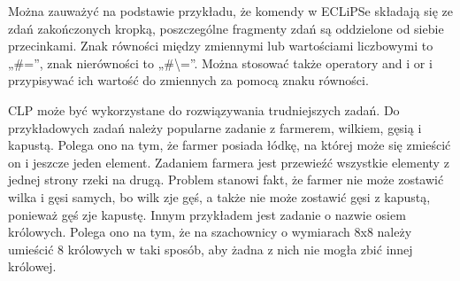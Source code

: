 Można zauważyć na podstawie przykładu, że komendy w ECLiPSe składają się ze zdań zakończonych kropką, poszczególne fragmenty zdań są oddzielone od siebie przecinkami. Znak równości między zmiennymi lub wartościami liczbowymi to „\#=”, znak nierówności to „\#\textbackslash=”. Można stosować także operatory and i or i przypisywać ich wartość do zmiennych za pomocą znaku równości. 

CLP może być wykorzystane do rozwiązywania trudniejszych zadań. Do przykładowych zadań należy popularne zadanie z farmerem, wilkiem, gęsią i kapustą. Polega ono na tym, że farmer posiada łódkę, na której może się zmieścić on i jeszcze jeden element. Zadaniem farmera jest przewieźć wszystkie elementy z jednej strony rzeki na drugą. Problem stanowi fakt, że farmer nie może zostawić wilka i gęsi samych, bo wilk zje gęś, a także nie może zostawić gęsi z kapustą, ponieważ gęś zje kapustę. Innym przykładem jest zadanie o nazwie osiem królowych. Polega ono na tym, że na szachownicy o wymiarach 8x8 należy umieścić 8 królowych w taki sposób, aby żadna z nich nie mogła zbić innej królowej.
